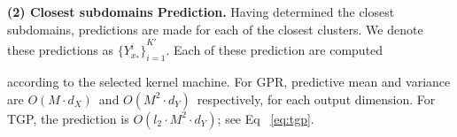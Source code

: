 \noindent\textbf{{(2) Closest subdomains Prediction.}}
Having determined the closest subdomains, predictions are made for each of the closest clusters. We denote these predictions as ${\{Y^i_{x_*}\}}_{i=1}^{K'}$.  Each of these prediction are computed  according to the selected kernel machine. For GPR, predictive mean and  variance are  $O(M\cdot d_X)\,$  and  $O(M^2 \cdot d_Y)\,$ respectively, for each output  dimension.  For TGP,   the prediction is  $O(l_2 \cdot M^2 \cdot d_Y)$; see Eq ~\ref{eq:tgp}.  
\begin{comment}
\textbf{GPR:}
\begin{equation}
\begin{split}
\hat{Y^i_{x_*}}_j = &\textbf{k}_{*_j}^T \mathcal{M}^i.(\textbf{K}_j + \sigma^2_{nj} \textbf{I})^{-1} \textbf{y}_j, \,\,
\sigma_{{Y^i_{x_*}}_j}^2  = k_{{**}_j} -\textbf{k}_{*_i}^T \mathcal{M}^i.(\textbf{K}^i_j + \sigma_{nj} \textbf{I})^{-1} \textbf{k}_{*_i})
\end{split}
\end{equation}
, where $\hat{Y^i_{x_*}}_j$ is the prediction output of the $j^{th}$ dimension at domain $i$.  Given $\mathcal{M}^i$ ,  $\hat{Y^i_{x_*}}_j$ and  $\sigma_{{Y^i_{x_*}}_j}^2$ are  $O(M)$  and  $O(M)^2$ respectively, for each dimension $j$.  

\textbf{TGP:}
\begin{equation}
\begin{split}
\hat{Y^i_{x_*}} =  \underset{Y^i_{x_*}}{\operatorname{argmin       }}[ & k_Y(Y^i_{x_*},Y^i_{x_*})  -2 k^i_y(Y_{x_*})^T \textbf{u}_i  -  \eta_i  log (k_Y(Y_{x_i},Y_{x_i})  -k^i_y(Y_{x_i})^T \mathcal{M}^i. ({\textbf{K}^i_Y}+ \lambda_y \textbf{I})^{-1}.  k^i_y(Y^i_{x_*}) ) ]
\end{split}
\end{equation}
where $\textbf{u}_i = \mathcal{M}^i.((\textbf{K}^i_X + \lambda^i_x  \textbf{I})^{-1}) \textbf{k}^i_x(\textbf{x}_*)$, $\eta  = K^i_X(\textbf{x}_*,\textbf{x}_*) -\textbf{k}(\textbf{x}_*)^T  \textbf{u} $.Given $\mathcal{M}^i$ , the $\hat{Y^i_{x_*}}_j$ has  $O(l_2 \cdot M)^2$ complexity, where $l_2$ is the number of iterations for  convergence of BFGS quasi-Newton gradient based optimizer. 
\end{comment}
